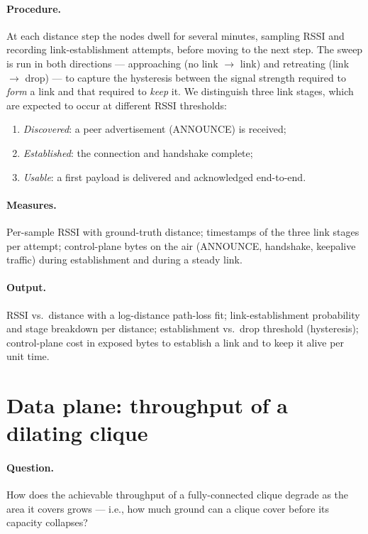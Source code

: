 \paragraph{Procedure.} At each distance step the nodes dwell for several minutes,
sampling RSSI and recording link-establishment attempts, before moving to the next
step. The sweep is run in both directions --- approaching (no link $\to$ link) and
retreating (link $\to$ drop) --- to capture the hysteresis between the signal strength
required to \emph{form} a link and that required to \emph{keep} it. We distinguish
three link stages, which are expected to occur at different RSSI thresholds:
\begin{enumerate}
    \item \emph{Discovered}: a peer advertisement (ANNOUNCE) is received;
    \item \emph{Established}: the connection and handshake complete;
    \item \emph{Usable}: a first payload is delivered and acknowledged end-to-end.
\end{enumerate}

\paragraph{Measures.} Per-sample RSSI with ground-truth distance; timestamps of the
three link stages per attempt; control-plane bytes on the air (ANNOUNCE, handshake,
keepalive traffic) during establishment and during a steady link.

\paragraph{Output.} RSSI vs.\ distance with a log-distance path-loss fit;
link-establishment probability and stage breakdown per distance; establishment vs.\
drop threshold (hysteresis); control-plane cost in exposed bytes to establish a link
and to keep it alive per unit time.

\section{Data plane: throughput of a dilating clique}

\paragraph{Question.} How does the achievable throughput of a fully-connected clique
degrade as the area it covers grows --- i.e., how much ground can a clique cover
before its capacity collapses?

